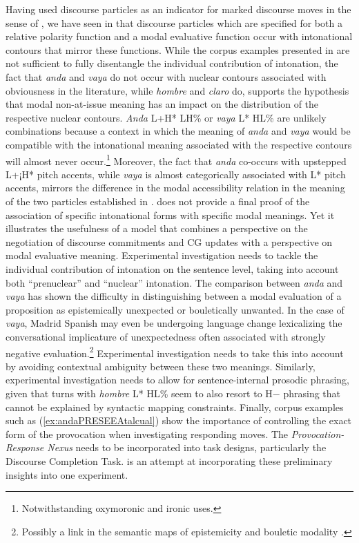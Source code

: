 Having used discourse particles as an indicator for marked discourse moves in the sense of , we have seen in  that discourse particles which are specified for both a relative polarity function and a modal evaluative function occur with intonational contours that mirror these functions. While the corpus examples presented in  are not sufficient to fully disentangle the individual contribution of intonation, the fact that \textit{anda} and \textit{vaya} do not occur with nuclear contours associated with obviousness in the literature, while \textit{hombre} and \textit{claro} do, supports the hypothesis that modal non-at-issue meaning has an impact on the distribution of the respective nuclear contours. \textit{Anda} L+H* LH\% or \textit{vaya} L* HL\% are unlikely combinations because a context in which the meaning of \textit{anda} and \textit{vaya} would be compatible with the intonational meaning associated with the respective contours will almost never occur.\footnote{Notwithstanding oxymoronic and ironic uses.} Moreover, the fact that \textit{anda} co-occurs with upstepped L+¡H* pitch accents, while \textit{vaya} is almost categorically associated with L* pitch accents, mirrors the difference in the modal accessibility relation in the meaning of the two particles established in .  does not provide a final proof of the association of specific intonational forms with specific modal meanings. Yet it illustrates the usefulness of a model that combines a perspective on the negotiation of discourse commitments and \ac{CG} updates with a perspective on modal evaluative meaning. Experimental investigation needs to tackle the individual contribution of intonation on the sentence level, taking into account both ``prenuclear'' and ``nuclear'' intonation. The comparison between \textit{anda} and \textit{vaya} has shown the difficulty in distinguishing between a modal evaluation of a proposition as epistemically unexpected or bouletically unwanted. In the case of \textit{vaya}, Madrid Spanish may even be undergoing language change lexicalizing the conversational implicature of unexpectedness often associated with strongly negative evaluation.\footnote{Possibly a link in the semantic maps of epistemicity and bouletic modality \citep{Anderson.1986,Boye.2010}.} Experimental investigation needs to take this into account by avoiding contextual ambiguity between these two meanings. Similarly, experimental investigation needs to allow for sentence-internal prosodic phrasing, given that turns with \textit{hombre} L* HL\% seem to also resort to H$-$ phrasing that cannot be explained by syntactic mapping constraints. Finally, corpus examples such as (\ref{ex:andaPRESEEAtalcual}) show the importance of controlling the exact form of the provocation when investigating responding moves. The \textit{Provocation-Response Nexus} needs to be incorporated into task designs, particularly the Discourse Completion Task.  is an attempt at incorporating these preliminary insights into one experiment.
